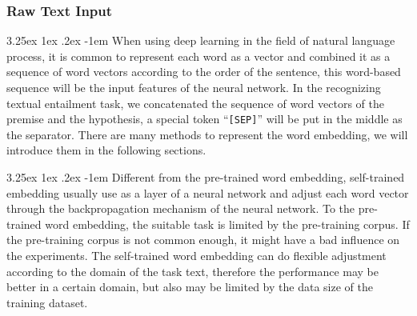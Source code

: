 \documentclass[12pt]{article}
\makeatletter
\newcounter{subsubsubsection}[subsubsection]
\renewcommand\paragraph{\@startsection{paragraph}{5}{\z@}%
  {3.25ex \@plus1ex \@minus.2ex}%
  {-1em}%
  {\normalfont\normalsize\bfseries}}
\makeatother
\begin{document}
\begin{CJK*}{UTF8}{bkai}
\begin{spacing}{1.77}
\subsubsection{Raw Text Input}
\paragraph{}
When using deep learning in the field of natural language process, it is common to represent each word as a vector and combined it as a sequence of word vectors according to the order of the sentence, this word-based sequence will be the input features of the neural network. In the recognizing textual entailment task, we concatenated the sequence of word vectors of the premise and the hypothesis, a special token ``\texttt{[SEP]}'' will be put in the middle as the separator. There are many methods to represent the word embedding, we will introduce them in the following sections.

\paragraph{}
Different from the pre-trained word embedding, self-trained embedding usually use as a layer of a neural network and adjust each word vector through the backpropagation mechanism of the neural network. To the pre-trained word embedding, the suitable task is limited by the pre-training corpus. If the pre-training corpus is not common enough, it might have a bad influence on the experiments. The self-trained word embedding can do flexible adjustment according to the domain of the task text, therefore the performance may be better in a certain domain, but also may be limited by the data size of the training dataset.


\end{spacing}
\end{CJK*}
\end{document}
